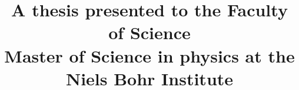 %
%
%
%
%


\documentclass[
		twoside,openright,titlepage,numbers=noenddot,headinclude,justified,%
	 	footinclude=true,cleardoublepage=empty,
		dottedtoc, %
    BCOR=10mm,paper=a4,fontsize=11pt, %
    ngerman,american, %
		]{scrreprt} %



  

\def \ColourPDF {FrontBackMatter/ku-farve.pdf}
\def \TitlePDF   {FrontBackMatter/nat-en.pdf}
\title{
  \normalsize{A thesis presented to the Faculty of Science} \\
  \large{Master of Science in physics at the Niels Bohr Institute} \\
  \vspace{1cm}
  \centering
  \Huge{\vspace{2cm} \myTitle}\\ %
}
\author{
  \huge{\myName} \\
  \normalsize{\texttt{\myMail}}
  \vspace{7cm} \\
  \large{\mySupervisor} \\
  \normalsize{\texttt{\mySupervisorMail}} \\
  \vspace{1cm} \\
}
\date{\myTime}
 

